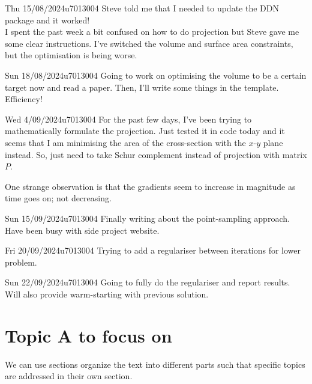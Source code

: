 \documentclass{project-logbook}
\begin{document}
	\begin{MeetingMinutes}{Thu 15/08/2024}{u7013004}
		Steve told me that I needed to update the DDN package and it worked!\\
		I spent the past week a bit confused on how to do projection but Steve gave me some clear instructions. I've switched the volume and surface area constraints, but the optimisation is being worse.
	\end{MeetingMinutes}

	\begin{MeetingMinutes}{Sun 18/08/2024}{u7013004}
		Going to work on optimising the volume to be a certain target now and read a paper. Then, I'll write some things in the template. Efficiency!
	\end{MeetingMinutes}

	\begin{MeetingMinutes}{Wed 4/09/2024}{u7013004}
		For the past few days, I've been trying to mathematically formulate the projection. Just tested it in code today and it seems that I am minimising the area of the cross-section with the $x$-$y$ plane instead. So, just need to take Schur complement instead of projection with matrix $P$.

		One strange observation is that the gradients seem to increase in magnitude as time goes on; not decreasing.
	\end{MeetingMinutes}
	
	\begin{MeetingMinutes}{Sun 15/09/2024}{u7013004}
		Finally writing about the point-sampling approach. Have been busy with side project website.
	\end{MeetingMinutes}

	\begin{MeetingMinutes}{Fri 20/09/2024}{u7013004}
		Trying to add a regulariser between iterations for lower problem.
	\end{MeetingMinutes}

	\begin{MeetingMinutes}{Sun 22/09/2024}{u7013004}
		Going to fully do the regulariser and report results. Will also provide warm-starting with previous solution. 
	\end{MeetingMinutes}

\section{Topic A to focus on} \label{sec:topic_A}
	We can use sections organize the text into different parts  such that specific topics are addressed in their own section.
\end{document}

